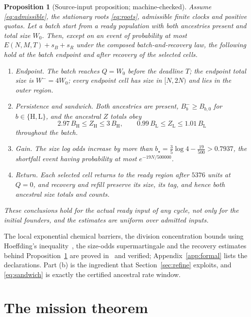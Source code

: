 \documentclass[11pt,a4paper]{article}
\theoremstyle{plain}
\newtheorem{proposition}[theorem]{Proposition}
\theoremstyle{definition}
\theoremstyle{remark}
\newcommand{\lo}{\mathrm L}
\newcommand{\hi}{\mathrm H}
\begin{document}
\begin{proposition}[Source-input proposition; machine-checked]\label{prop:input}
Assume \eqref{eq:admissible}, the stationary roots \eqref{eq:roots}, admissible
finite clocks and positive quotas. Let a batch start from a ready population
with both ancestries present and total size $W_0$. Then, except on an event of
probability at most $E(N,M,T)+s_B+s_R$ under the composed batch-and-recovery
law, the following hold at the batch endpoint and after recovery of the
selected cells.
\begin{enumerate}[label=\emph{(\alph*)}]
\item \emph{Endpoint.} The batch reaches $Q=W_0$ before the deadline $T$; the
endpoint total size is $W^-=4W_0$; every endpoint cell has size in $[N,2N)$ and
lies in the outer region.
\item \emph{Persistence and sandwich.} Both ancestries are present,
$B_b^-\ge B_{b,0}$ for $b\in\{\hi,\lo\}$, and the ancestral $Z$ totals obey
\begin{equation}\label{eq:sandwich}
2.97\,B_\hi\le Z_\hi\le3\,B_\hi,\qquad
0.99\,B_\lo\le Z_\lo\le1.01\,B_\lo
\end{equation}
throughout the batch.
\item \emph{Gain.} The size log odds increase by more than
$b_\star=\frac35\log4-\frac{19}{500}>0.7937$, the shortfall event having
probability at most $e^{-19N/500000}$.
\item \emph{Return.} Each selected cell returns to the ready region after
$5376$ units at $Q=0$, and recovery and refill preserve its size, its tag, and
hence both ancestral size totals and counts.
\end{enumerate}
These conclusions hold for the actual ready input of any cycle, not only for
the initial founders, and the estimates are uniform over admitted inputs.
\end{proposition}

The local exponential chemical barriers, the division concentration bounds
using Hoeffding's inequality~\citep{hoeffding1963}, the size-odds supermartingale
and the recovery estimates behind Proposition~\ref{prop:input} are proved
in~\citep{batch2026,serial2026} and verified; Appendix~\ref{app:formal} lists
the declarations. Part (b) is the ingredient that Section~\ref{sec:refine}
exploits, and \eqref{eq:sandwich} is exactly the certified ancestral rate
window.

\section{The mission theorem}\label{sec:main}
\end{document}
